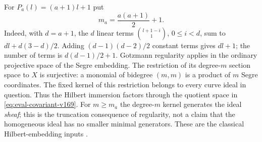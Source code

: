 \documentclass[11pt,reqno]{amsart}
\numberwithin{equation}{section}
\theoremstyle{definition}\newtheorem{definition}[theorem]{Definition}
\theoremstyle{remark}\newtheorem{remark}[theorem]{Remark}
\begin{document}
For $P_a(l)=(a+1)l+1$ put
\begin{equation}\label{eq:gotzmann-size-v169}
 m_a=\frac{a(a+1)}2+1.
\end{equation}
Indeed, with $d=a+1$, the $d$ linear terms
$\binom{l+1-i}{1}$, $0\leq i<d$, sum to
$dl+d(3-d)/2$. Adding $(d-1)(d-2)/2$ constant terms gives $dl+1$;
the number of terms is $d(d-1)/2+1$. Gotzmann regularity applies in
the ordinary projective space of the Segre embedding. The restriction
of its degree-$m$ section space to $X$ is surjective: a monomial of
bidegree $(m,m)$ is a product of $m$ Segre coordinates. The fixed
kernel of this restriction belongs to every curve ideal in question.
Thus the Hilbert immersion factors through the quotient space in
\eqref{eq:eval-covariant-v169}. For $m\geq m_a$ the degree-$m$ kernel
generates the ideal \emph{sheaf}; this is the truncation consequence of
regularity, not a claim that the homogeneous ideal has no smaller
minimal generators. These are the classical Hilbert-embedding inputs
\cite{Gotzmann167}.
\end{document}
